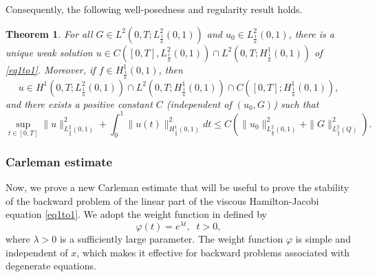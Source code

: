 \documentclass[reqno]{amsart}
\theoremstyle{plain}
\newtheorem{theorem}{Theorem}[section]
\theoremstyle{remark}
\numberwithin{equation}{section}
\begin{document}
Consequently, the following well-posedness and regularity result holds.
\begin{theorem}\label{thmgenni}
     For all $ G\in L^{2}(0,T; L^{2}_{\frac{1}{a}}(0,1))$ and $u_{0} \in L^{2}_{\frac{1}{a}}(0,1)$, there is a unique weak solution $u \in C([0,T],L^{2}_{\frac{1}{a}}(0,1))\cap  L^{2}(0,T; H^{1}_{\frac{1}{a}}(0,1) )$ of \eqref{eq1to1}. Moreover, if $f\in H^{1}_{\frac{1}{a}}(0,1) $, then 
     $$u \in H^1\left(0,T; L^2_{\frac{1}{a}}(0,1)\right)\cap L^2\left(0,T;H^{1}_{\frac{1}{a}}(0,1)\right)\cap C\left([0,T];H^{1}_{\frac{1}{a}}(0,1)\right),$$
     and there exists a positive constant $C$ (independent of $(u_0,G)$) such that
     $$ \sup_{t \in [0,T]}\| u\|^2_{L^{2}_{\frac{1}{a}}(0,1)}+\int_{0}^1\| u(t)\|^2_{H^{1}_{\frac{1}{a}}(0,1)}dt \leqslant C\left(\| u_{0}\|^2_{L^{2}_{\frac{1}{a}}(0,1)}+ \| G\|^2_{L^{2}_{\frac{1}{a}}(Q)}\right).$$
 \end{theorem}

\subsubsection{\bf Carleman estimate}\label{secCar1}
Now, we prove a new Carleman estimate that will be useful to prove the stability of the backward problem of the linear part of the viscous Hamilton-Jacobi equation \eqref{eq1to1}. We adopt the weight function in \cite{CY23} defined by
\begin{equation}
\varphi(t)=e^{\lambda t}, \;\; t>0,
\end{equation}
where $\lambda>0$ is a sufficiently large parameter. The weight function $\varphi$ is simple and independent of $x$, which makes it effective for backward problems associated with degenerate equations.
\end{document}
